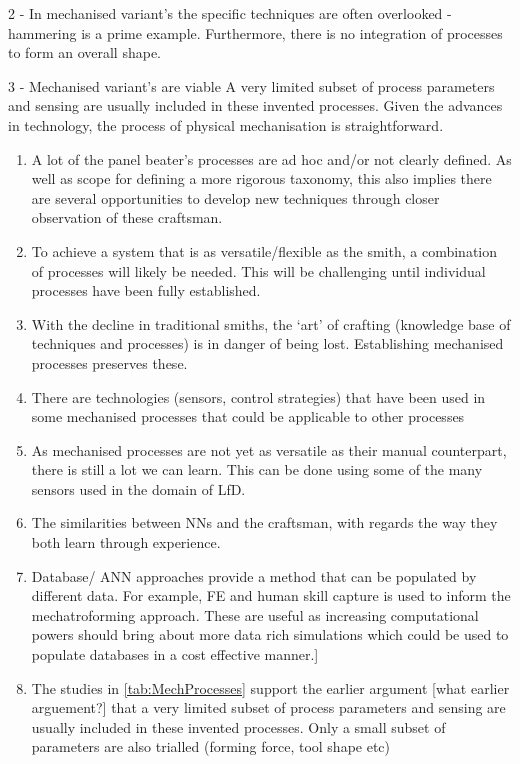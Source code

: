 2 - In mechanised variant's the specific techniques are often overlooked - hammering is a prime example.
Furthermore, there is no integration of processes to form an overall shape.
 
3 -  Mechanised variant's are viable
A very limited subset of process parameters and sensing are usually included in these invented processes. 
Given the advances in technology, the process of physical mechanisation is straightforward. 


\begin{enumerate}

\item A lot of the panel beater's processes are ad hoc and/or not clearly defined. As well as scope for defining a more rigorous taxonomy, this also implies there are several opportunities to develop new techniques through closer observation of these craftsman.
\item To achieve a system that is as versatile/flexible as the smith, a combination of processes will likely be needed. This will be challenging until individual processes have been fully established.
\item With the decline in traditional smiths, the `art' of crafting (knowledge base of techniques and processes) is in danger of being lost. Establishing mechanised processes preserves these.
\item There are technologies (sensors, control strategies) that have been used in some mechanised processes that could be applicable to other processes
\item As mechanised processes are not yet as versatile as their manual counterpart, there is still a lot we can learn. This can be done using some of the many sensors used in the domain of LfD.
\item The similarities between NNs and the craftsman, with regards the way they both learn through experience. 
\item Database/ ANN approaches provide a method that can be populated by different data. For example, FE and human skill capture is used to inform the mechatroforming approach. These are useful as increasing computational powers should bring about more data rich simulations which could be used to populate databases in a cost effective manner.]
\item The studies in \ref{tab:MechProcesses} support the earlier argument [what earlier arguement?] that a very limited subset of process parameters and sensing are usually included in these invented processes. Only a small subset of parameters are also trialled (forming force, tool shape etc)

\end{enumerate}





\renewcommand{\bibname}{References}
\clearpage
%

%


